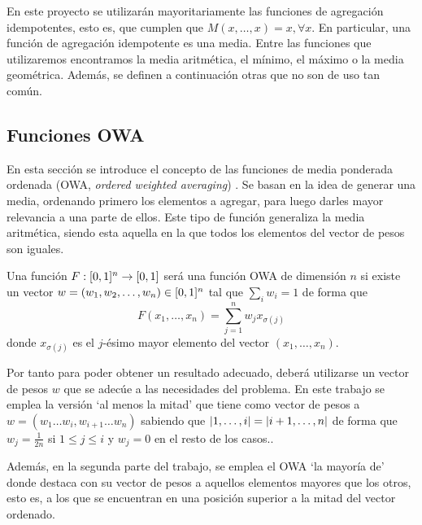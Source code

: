 En este proyecto se utilizarán mayoritariamente las funciones de agregación idempotentes, esto es, que cumplen que $M(x,\dots ,x)=x, \forall x$. En particular, una función de agregación idempotente es una media. Entre las funciones que utilizaremos encontramos la media aritmética, el mínimo, el máximo o la media geométrica. Además, se definen a continuación otras que no son de uso tan común.
\subsection{Funciones OWA}
En esta sección se introduce el concepto de las funciones de media ponderada ordenada (OWA, {\em  ordered weighted averaging}) \cite{art:yagerowa, art:paternain, art:bustinceowa}. Se basan en la idea de generar una media, ordenando primero los elementos a agregar, para luego darles mayor relevancia a una parte de ellos. Este tipo de función generaliza la media aritmética, siendo esta aquella  en la que todos los elementos del vector de pesos son iguales.

\begin{definition}\label{def:owa}
Una  función $F:[0,1]^n\rightarrow[0,1]$ será una función OWA de dimensión $n$ si existe un vector $w=(w_{1},w_{2},\dots,w_{n})\in [0,1]^{n}$ tal que $\sum_{i}w_{i}=1$ de forma que
$$F(x_{1},\dots,x_{n})=\sum^{n}_{j=1}w_{j}x_{\sigma(j)}$$
donde $x_{\sigma(j)}$ es el $j$-ésimo mayor elemento del vector $(x_{1},\dots,x_{n})$.
\end{definition}

Por tanto para poder obtener un resultado adecuado, deberá utilizarse un vector de pesos $w$ que se adecúe a las necesidades del problema. En este trabajo se emplea la versión `al menos la mitad' %
 que tiene como vector de pesos a $w=(w_{1}\dots w_{i}, w_{i+1}\dots w_{n})$ sabiendo que $\left\vert1, \dots, i\right\vert=\left\vert i+1,\dots,n\right\vert$ de forma que $w_{j}=\frac{1}{2n}$ si $1\leq j\leq i$ y $w_{j}=0$ en el resto de los casos..

Además, en la segunda parte del trabajo, se emplea el OWA `la mayoría de' donde destaca con su vector de pesos a aquellos elementos mayores que los otros, esto es, a los que se encuentran en una posición superior a la mitad del vector ordenado. 

